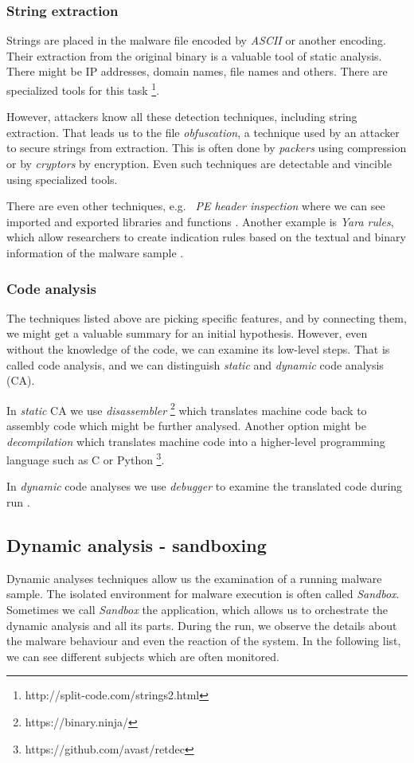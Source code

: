 \subsubsection*{String extraction}
Strings are placed in the malware file encoded by \emph{ASCII} or another encoding. Their extraction from the original binary is a valuable tool of static analysis. There might be IP addresses, domain names, file names and others. There are specialized tools for this task \footnote{http://split-code.com/strings2.html}. 

However, attackers know all these detection techniques, including string extraction. That leads us to the file \emph{obfuscation}, a technique used by an attacker to secure strings from extraction. This is often done by \emph{packers} using compression or by \emph{cryptors} by encryption. Even such techniques are detectable and vincible using specialized tools.

There are even other techniques, e.g. \ \emph{PE header inspection} where we can see imported and exported libraries and functions \cite{Sikorski2012}. Another example is \emph{Yara rules}, which allow researchers to create indication rules based on the textual and binary information of the malware sample \cite{KA2018}.

\subsubsection*{Code analysis}
The techniques listed above are picking specific features, and by connecting them, we might get a valuable summary for an initial hypothesis. 
However, even without the knowledge of the code, we can examine its low-level steps. That is called code analysis, and we can distinguish \emph{static} and \emph{dynamic} code analysis (CA).

In \emph{static} CA we use \emph{disassembler} \footnote{https://binary.ninja/} which translates machine code back to assembly code which might be further analysed. Another option might be \emph{decompilation} which translates machine code into a higher-level programming language such as C or Python \footnote{https://github.com/avast/retdec}.

In \emph{dynamic} code analyses we use \emph{debugger} to examine the translated code during run \cite{KA2018}.

\subsection{Dynamic analysis - sandboxing}
Dynamic analyses techniques allow us the examination of a running malware sample. The isolated environment for malware execution is often called \emph{Sandbox}. Sometimes we call \emph{Sandbox} the application, which allows us to orchestrate the dynamic analysis and all its parts. During the run, we observe the details about the malware behaviour and even the reaction of the system. In the following list, we can see different subjects which are often monitored.

